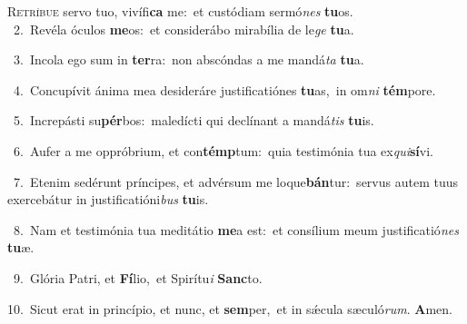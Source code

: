 \lettrine{\initial\textcolor{\initialcolor}{R}}{etríbue} servo tuo, vivífi\textbf{ca} me:~\star et custódiam sermó\textit{nes} \textbf{tu}\-os.\\
{\numbfont\textcolor{\numbcolor}{~2.}}~Revéla óculos \textbf{me}\-os:~\star et considerábo mirabília de le\textit{ge} \textbf{tu}\-a.\par
{\numbfont\textcolor{\numbcolor}{~3.}}~Incola ego sum in \textbf{ter}\-ra:~\star non abscóndas a me mandá\textit{ta} \textbf{tu}\-a.\par
{\numbfont\textcolor{\numbcolor}{~4.}}~Concupívit ánima mea desideráre justificatiónes \textbf{tu}\-as,~\star in om\textit{ni} \textbf{tém}\-pore.\par
{\numbfont\textcolor{\numbcolor}{~5.}}~Increpásti su\-\textbf{pér}\-bos:~\star maledícti qui declínant a mandá\textit{tis} \textbf{tu}\-is.\par
{\numbfont\textcolor{\numbcolor}{~6.}}~Aufer a me oppróbrium, et con\-\textbf{témp}\-tum:~\star quia testimónia tua ex\-\textit{qui}\-\textbf{sí}vi.\par
{\numbfont\textcolor{\numbcolor}{~7.}}~Etenim sedérunt príncipes, et advérsum me loque\-\textbf{bán}\-tur:~\star servus autem tuus exercebátur in justificatióni\textit{bus} \textbf{tu}\-is.\par
{\numbfont\textcolor{\numbcolor}{~8.}}~Nam et testimónia tua meditátio \textbf{me}\-a est:~\star et consílium meum justificatió\textit{nes} \textbf{tu}\-æ.\par
{\numbfont\textcolor{\numbcolor}{~9.}}~Glória Patri, et \textbf{Fí}\-lio,~\star et Spirítu\textit{i} \textbf{Sanc}\-to.\par
{\numbfont\textcolor{\numbcolor}{10.}}~Sicut erat in princípio, et nunc, et \textbf{sem}\-per,~\star et in sǽcula sæculó\-\textit{rum}\-. \textbf{A}\-men.\par
